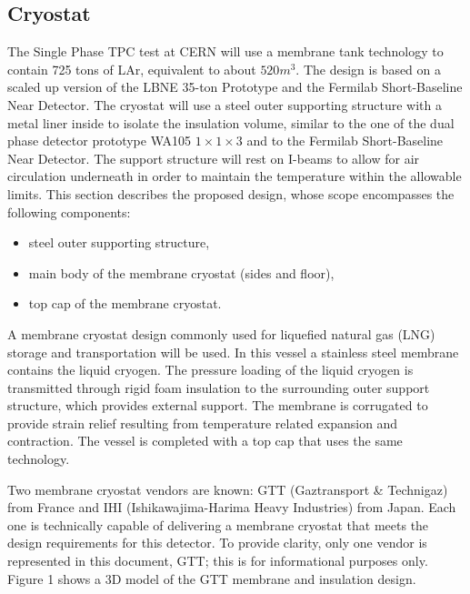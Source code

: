 
\subsection{Cryostat}

The Single Phase TPC test at CERN will use a membrane tank technology to contain  725 tons of LAr, equivalent to about $520 m^3$. The design is based on a scaled up version of the LBNE 35-ton Prototype and the Fermilab Short-Baseline Near Detector.  
The cryostat will use a steel outer supporting structure with a metal liner inside to isolate the insulation volume, similar to the one of the dual phase detector prototype WA105 $1\times1\times3$ and to the Fermilab Short-Baseline Near Detector. The support structure will rest on I-beams to allow for air circulation underneath in order to maintain the temperature within the allowable limits.
This section describes the proposed design, whose scope encompasses the following components:

\begin{itemize}
\item steel outer supporting structure,
\item main body of the membrane cryostat (sides and floor), 
\item top cap of the membrane cryostat.
\end{itemize}

A membrane cryostat design commonly used for liquefied natural gas (LNG) storage and transportation will be used. In this vessel a stainless steel membrane contains the liquid cryogen. The pressure loading of the liquid cryogen is transmitted through rigid foam insulation to the surrounding outer support structure, which provides external support. The membrane is corrugated to provide strain relief resulting from temperature related expansion and contraction. The vessel is completed with a top cap that uses the same technology.

Two membrane cryostat vendors are known: GTT (Gaztransport \& Technigaz) from France and IHI (Ishikawajima-Harima Heavy Industries) from Japan. Each one is technically capable of delivering a membrane cryostat that meets the design requirements for this detector. To provide clarity, only one vendor is represented in this document, GTT; this is for informational purposes only. Figure 1 shows a 3D model of the GTT membrane and insulation design.


